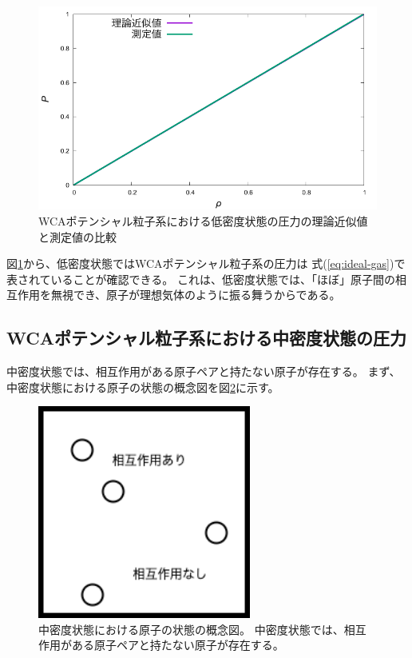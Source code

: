 \documentclass[titlepage]{jsreport}
\begin{document}
{{{\begin{figure}[htbp]
    \begin{center}
        \includegraphics[width=14cm]{fig/lowden_compare:den-pre.pdf}
    \end{center}
    \caption{WCAポテンシャル粒子系における低密度状態の圧力の理論近似値と測定値の比較}
    \label{fig:lowden_compare:den-pre}
\end{figure}

図\ref{fig:lowden_compare:den-pre}から、低密度状態ではWCAポテンシャル粒子系の圧力は
式(\ref{eq:ideal-gas})で表されていることが確認できる。
これは、低密度状態では、「ほぼ」原子間の相互作用を無視でき、原子が理想気体のように振る舞うからである。

\newpage
\subsection{WCAポテンシャル粒子系における中密度状態の圧力}\label{results-subsec:WCA-press-middle-density}
中密度状態では、相互作用がある原子ペアと持たない原子が存在する。
まず、中密度状態における原子の状態の概念図を図\ref{fig:middledensity.png}に示す。

\begin{figure}[htbp]
    \begin{center}
        \includegraphics[width=7cm]{fig/middledensity.png}
    \end{center}
    \caption{中密度状態における原子の状態の概念図。
    中密度状態では、相互作用がある原子ペアと持たない原子が存在する。}
    \label{fig:middledensity.png}
\end{figure}


}}}
\end{document}
